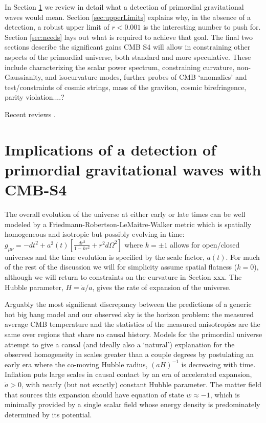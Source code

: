 In Section \ref{sec:detection} we review in detail what a detection of primordial gravitational waves would mean. Section \ref{sec:upperLimits} explains why, in the absence of a detection, a robust upper limit of $r<0.001$ is the interesting number to push for. Section \ref{sec:needs} lays out what is required to achieve that goal. The final two sections describe the significant gains CMB S4 will allow in constraining other aspects of the primordial universe, both standard and more speculative. These include characterizing the scalar power spectrum, constraining curvature, non-Gaussianity, and isocurvature modes, further probes of CMB `anomalies' and test/constraints of cosmic strings, mass of the graviton, cosmic birefringence, parity violation....?
 
Recent reviews \cite{Kamionkowski:2015yta}.

\section{Implications of a detection of primordial gravitational waves with CMB-S4}
\label{sec:detection}
The overall evolution of the universe at either early or late times can be well modeled by a Friedmann-Robertson-LeMaitre-Walker metric which is spatially homogeneous and isotropic but possibly evolving in time: $g_{\mu\nu}=-dt^2+a^2(t)[\frac{dr^2}{1-kr^2}+r^2d\Omega^2]$ where $k=\pm1$ allows for open/closed universes and the time evolution is specified by the scale factor, $a(t)$. For much of the rest of the discussion we will for simplicity assume spatial flatness ($k=0$), although we will return to constraints on the curvature in Section xxx. The Hubble parameter, $H=\dot{a}/a$, gives the rate of expansion of the universe. 

Arguably the most significant discrepancy between the predictions of a generic hot big bang model and our observed sky is the horizon problem: the measured average CMB temperature and the statistics of the measured anisotropies are the same over regions that share no causal history. Models for the primordial universe attempt to give a causal (and ideally also a `natural') explanation for the observed homogeneity in scales greater than a couple degrees by postulating an early era where the co-moving Hubble radius, $(aH)^{-1}$ is decreasing with time. Inflation puts large scales in causal contact by an era of accelerated expansion, $\ddot{a}>0$, with nearly (but not exactly) constant Hubble parameter. The matter field that sources this expansion should have equation of state $w\approx -1$, which is minimally provided by a single scalar field whose energy density is predominately determined by its potential.

